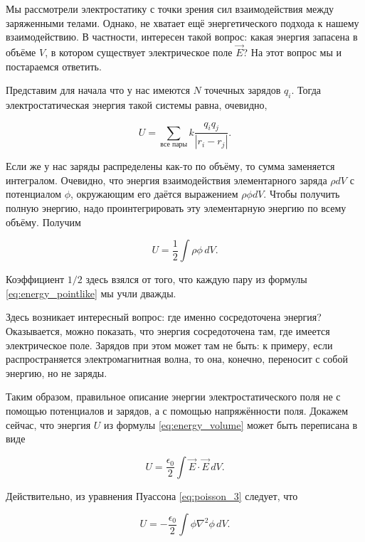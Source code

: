 \documentclass[11pt,a4paper]{article}
\numberwithin{equation}{section}
\newcommand{\eps}{\epsilon}
\begin{document}
Мы рассмотрели электростатику с точки зрения сил взаимодействия между
заряженными телами. Однако, не хватает ещё энергетического подхода к
нашему взаимодействию. В частности, интересен такой вопрос: какая
энергия запасена в объёме $V$, в котором существует электрическое поле
$\vec{E}$? На этот вопрос мы и постараемся ответить.

Представим для начала что у нас имеются $N$ точечных зарядов
$q_i$. Тогда электростатическая энергия такой системы равна, очевидно, 

\begin{equation}
  \label{eq:energy_pointlike}
  U = \sum_{\text{все пары}} k \frac{q_i q_j}{|r_i - r_j|}.
\end{equation}

Если же у нас заряды распределены как-то по объёму, то сумма
заменяется интегралом. Очевидно, что энергия взаимодействия
элементарного заряда $\rho dV$ с потенциалом $\phi$, окружающим его
даётся выражением $\rho \phi dV$. Чтобы получить полную энергию,
надо проинтегрировать эту элементарную энергию по всему
объёму. Получим

\begin{equation}
  \label{eq:energy_volume}
  U = \frac12 \int \rho \phi\, dV.
\end{equation}

Коэффициент $1/2$ здесь взялся от того, что каждую пару из формулы
\eqref{eq:energy_pointlike} мы учли дважды. 

Здесь возникает интересный вопрос: где именно сосредоточена энергия?
Оказывается, можно показать, что энергия сосредоточена там, где
имеется электрическое поле. Зарядов при этом может там не быть: к
примеру, если распространяется электромагнитная волна, то она,
конечно, переносит с собой энергию, но не заряды. 

Таким образом, правильное описание энергии электростатического поля не
с помощью потенциалов и зарядов, а с помощью напряжённости
поля. Докажем сейчас, что энергия $U$ из формулы
\eqref{eq:energy_volume} может быть переписана в виде

\begin{equation}
  \label{eq:energy_field}
  U = \frac{\eps_0}{2} \int \vec{E} \cdot \vec{E} \, dV.
\end{equation}

Действительно, из уравнения Пуассона \eqref{eq:poisson_3} следует, что 

\begin{equation}
  \label{eq:energy_field_der_1}
  U = - \frac{\eps_0}{2} \int \phi \nabla^2 \phi \, dV.
\end{equation}
\end{document}
